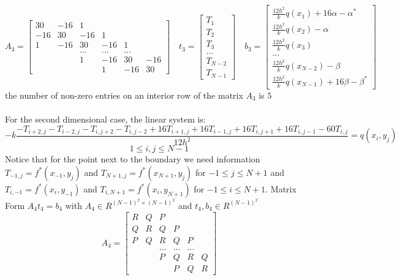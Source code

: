 \documentclass{article}
\begin{document}
\[
A_3 = 
\begin{bmatrix}
    30  & -16 &  1    &       &        &       \\
    -16 & 30  & -16 & 1     &        &       \\
       1 & -16 &  30  & -16 & 1     &       \\
          &       &  ...   &   ...  &  ...   &       \\
          &       &   1   & -16  & 30   & -16 \\
          &       &        &    1  &  -16 &  30
\end{bmatrix}
\quad t_3 =
\begin{bmatrix}
    T_1\\
    T_2\\
    T_3\\
     ...\\
     T_{N-2}\\
     T_{N-1}
\end{bmatrix}
\quad b_3 =
\begin{bmatrix}
    \frac{12h^2}{k}q(x_1) + 16\alpha - \alpha^{*}\\
    \frac{12h^2}{k}q(x_2) - \alpha\\
    \frac{12h^2}{k}q(x_3)\\
     ...\\
      \frac{12h^2}{k}q(x_{N-2}) - \beta\\
      \frac{12h^2}{k}q(x_{N-1}) + 16\beta - \beta^{*}
\end{bmatrix}
\]
the number of non-zero entries on an interior row of the matrix $A_3$ is $5$\\ \\
For the second dimensional case, the linear system is:
\[
-k\frac{- T_{i+2, j} - T_{i-2, j} - T_{i, j+2} - T_{i, j-2} + 16T_{i+1, j} + 16T_{i-1, j} + 16T_{i, j+1} + 16T_{i, j-1} - 60T_{i, j}}{12h^2} = q(x_i, y_j)
\]
\[
1 \leq i, j \leq N-1
\]
Notice that for the point next to the boundary we need information $T_{-1, j} = f^{*}(x_{-1}, y_j)$ and $T_{N+1, j} = f^{*}(x_{N+1}, y_j)$ for $-1 \leq j \leq N+1$ and $T_{i, -1} = f^{*}(x_i, y_{-1})$ and $T_{i, N+1} = f^{*}(x_i, y_{N+1})$ for $-1 \leq i \leq N+1$. Matrix Form $A_4t_4 = b_4$ with $A_4 \in R^{(N-1)^2 \times (N-1)^2}$ and $t_4, b_4 \in R^{(N-1)^2}$
\[
A_4 = 
\begin{bmatrix}
    R    &  Q   &  P    &        &      &     \\
    Q    &  R   &  Q   &  P    &      &     \\
    P     &  Q  &  R   &  Q    &  P  &      \\
           &       &  ...   &   ...  &  ...  &      \\
           &       &   P   &  Q   &  R  &  Q  \\
           &       &        &   P   &  Q  &  R
\end{bmatrix}
\]
\end{document}
